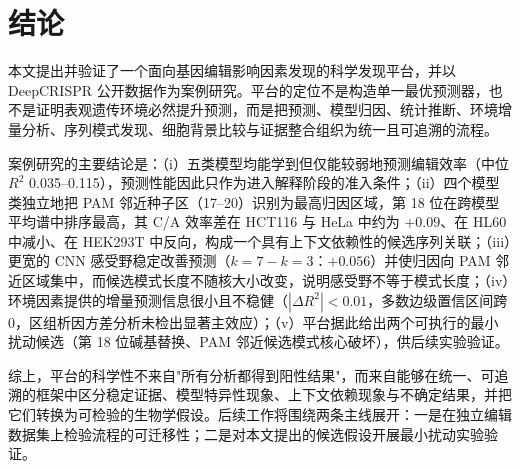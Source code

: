 \section{结论}
\label{sec:conclusion}

本文提出并验证了一个面向基因编辑影响因素发现的科学发现平台，并以 DeepCRISPR 公开数据作为案例研究。平台的定位不是构造单一最优预测器，也不是证明表观遗传环境必然提升预测，而是把预测、模型归因、统计推断、环境增量分析、序列模式发现、细胞背景比较与证据整合组织为统一且可追溯的流程。

案例研究的主要结论是：（i）五类模型均能学到但仅能较弱地预测编辑效率（中位 $R^{2}$ 0.035--0.115），预测性能因此只作为进入解释阶段的准入条件；（ii）四个模型类独立地把 PAM 邻近种子区（17--20）识别为最高归因区域，第 18 位在跨模型平均谱中排序最高，其 C/A 效率差在 HCT116 与 HeLa 中约为 $+0.09$、在 HL60 中减小、在 HEK293T 中反向，构成一个具有上下文依赖性的候选序列关联；（iii）更宽的 CNN 感受野稳定改善预测（$k=7-k=3$：$+0.056$）并使归因向 PAM 邻近区域集中，而候选模式长度不随核大小改变，说明感受野不等于模式长度；（iv）环境因素提供的增量预测信息很小且不稳健（$|\Delta R^{2}|<0.01$，多数边级置信区间跨 0，区组析因方差分析未检出显著主效应）；（v）平台据此给出两个可执行的最小扰动候选（第 18 位碱基替换、PAM 邻近候选模式核心破坏），供后续实验验证。

综上，平台的科学性不来自"所有分析都得到阳性结果"，而来自能够在统一、可追溯的框架中区分稳定证据、模型特异性现象、上下文依赖现象与不确定结果，并把它们转换为可检验的生物学假设。后续工作将围绕两条主线展开：一是在独立编辑数据集上检验流程的可迁移性；二是对本文提出的候选假设开展最小扰动实验验证。

